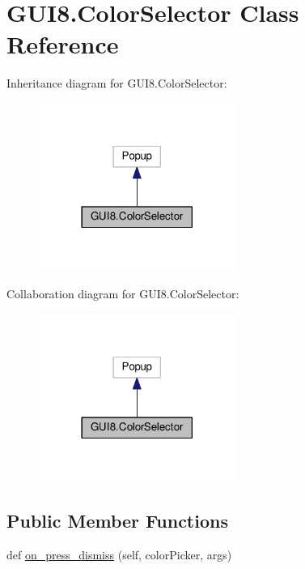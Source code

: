 \hypertarget{classGUI8_1_1ColorSelector}{}\section{G\+U\+I8.\+Color\+Selector Class Reference}
\label{classGUI8_1_1ColorSelector}


Inheritance diagram for G\+U\+I8.\+Color\+Selector\+:
\nopagebreak
\begin{figure}[H]
\begin{center}
\leavevmode
\includegraphics[width=182pt]{classGUI8_1_1ColorSelector__inherit__graph}
\end{center}
\end{figure}


Collaboration diagram for G\+U\+I8.\+Color\+Selector\+:
\nopagebreak
\begin{figure}[H]
\begin{center}
\leavevmode
\includegraphics[width=182pt]{classGUI8_1_1ColorSelector__coll__graph}
\end{center}
\end{figure}
\subsection*{Public Member Functions}
\begin{DoxyCompactItemize}
\item 
def \hyperlink{classGUI8_1_1ColorSelector_af1c3dc2b6ada3189e0d69d7a16c347a7}{on\+\_\+press\+\_\+dismiss} (self, color\+Picker, args)
\end{DoxyCompactItemize}

